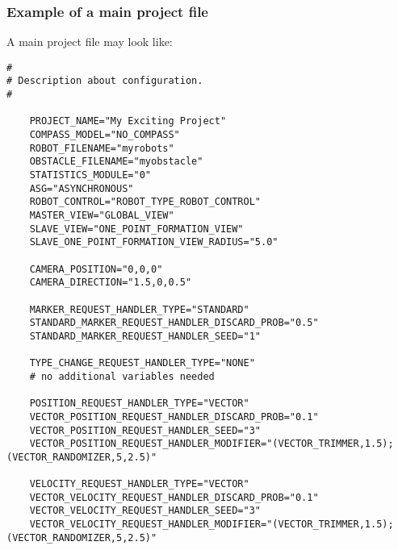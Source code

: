\subsubsection{Example of a main project file}
A main project file may look like:
\lstset{language=tcl}
\begin{lstlisting}
# 
# Description about configuration.
#
	
	PROJECT_NAME="My Exciting Project"
	COMPASS_MODEL="NO_COMPASS"
	ROBOT_FILENAME="myrobots"
	OBSTACLE_FILENAME="myobstacle"
	STATISTICS_MODULE="0"
	ASG="ASYNCHRONOUS"
	ROBOT_CONTROL="ROBOT_TYPE_ROBOT_CONTROL"
	MASTER_VIEW="GLOBAL_VIEW"
	SLAVE_VIEW="ONE_POINT_FORMATION_VIEW"
	SLAVE_ONE_POINT_FORMATION_VIEW_RADIUS="5.0"
	
	CAMERA_POSITION="0,0,0"
	CAMERA_DIRECTION="1.5,0,0.5"
	
	MARKER_REQUEST_HANDLER_TYPE="STANDARD"
	STANDARD_MARKER_REQUEST_HANDLER_DISCARD_PROB="0.5"
	STANDARD_MARKER_REQUEST_HANDLER_SEED="1"

	TYPE_CHANGE_REQUEST_HANDLER_TYPE="NONE"
	# no additional variables needed

	POSITION_REQUEST_HANDLER_TYPE="VECTOR"
	VECTOR_POSITION_REQUEST_HANDLER_DISCARD_PROB="0.1"
	VECTOR_POSITION_REQUEST_HANDLER_SEED="3"
	VECTOR_POSITION_REQUEST_HANDLER_MODIFIER="(VECTOR_TRIMMER,1.5);(VECTOR_RANDOMIZER,5,2.5)"

	VELOCITY_REQUEST_HANDLER_TYPE="VECTOR"
	VECTOR_VELOCITY_REQUEST_HANDLER_DISCARD_PROB="0.1"
	VECTOR_VELOCITY_REQUEST_HANDLER_SEED="3"
	VECTOR_VELOCITY_REQUEST_HANDLER_MODIFIER="(VECTOR_TRIMMER,1.5);(VECTOR_RANDOMIZER,5,2.5)"
\end{lstlisting}


